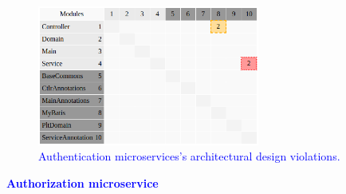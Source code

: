 \documentclass[12pt]{article}
\begin{document}
\begin{figure}[ht]
\centering
\includegraphics[width=0.65\textwidth]{figuras/violacoesAuthentication.png}
\caption{\textcolor{blue}{Authentication microservices's architectural design violations.}}
\label{fig:microservices}
\end{figure}
\newpage
\noindent\textbf{\textcolor{blue}{Authorization microservice}}
\label{sec:ApendiceAuthorization}
\end{document}
